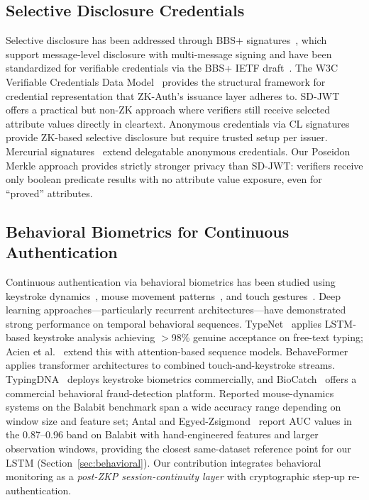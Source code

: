 \documentclass[journal,twoside,10pt]{IEEEtran}
\begin{document}
\subsection{Selective Disclosure Credentials}
Selective disclosure has been addressed through BBS+ signatures~\cite{bbs},
which support message-level disclosure with multi-message signing and have
been standardized for verifiable credentials via the BBS+ IETF
draft~\cite{bbsplus}. The W3C Verifiable Credentials Data Model~\cite{w3cvc}
provides the structural framework for credential representation that
ZK-Auth's issuance layer adheres to. SD-JWT~\cite{sdjwt} offers a practical
but non-ZK approach where verifiers still receive selected attribute values
directly in cleartext. Anonymous credentials via CL signatures~\cite{cl} provide
ZK-based selective disclosure but require trusted setup per issuer. Mercurial
signatures~\cite{mercurial} extend delegatable anonymous credentials. Our Poseidon Merkle approach provides strictly stronger privacy than
SD-JWT: verifiers receive only boolean predicate results with no attribute
value exposure, even for ``proved'' attributes.

\subsection{Behavioral Biometrics for Continuous Authentication}
Continuous authentication via behavioral biometrics has been studied using
keystroke dynamics~\cite{shepherd95,monrose00}, mouse movement
patterns~\cite{nakkabi11,ahmed07}, and touch gestures~\cite{frank13}. Deep
learning approaches---particularly recurrent architectures---have
demonstrated strong performance on temporal behavioral sequences. TypeNet~\cite{typenet}
applies LSTM-based keystroke analysis achieving $>$98\% genuine acceptance
on free-text typing; Acien et al.~\cite{acien21} extend this with
attention-based sequence models.
BehaveFormer~\cite{behaveformer} applies transformer architectures to
combined touch-and-keystroke streams.
TypingDNA~\cite{typingdna} deploys keystroke biometrics commercially, and BioCatch~\cite{biocatch} offers a commercial behavioral
fraud-detection platform. Reported mouse-dynamics systems on the Balabit
benchmark span a wide accuracy range depending on window size and feature
set; Antal and Egyed-Zsigmond~\cite{antal19} report AUC values in the
0.87--0.96 band on Balabit with hand-engineered features and larger
observation windows, providing the closest same-dataset reference point for
our LSTM (Section~\ref{sec:behavioral}). Our
contribution integrates behavioral monitoring as a \textit{post-ZKP
session-continuity layer} with cryptographic step-up re-authentication.
\end{document}

